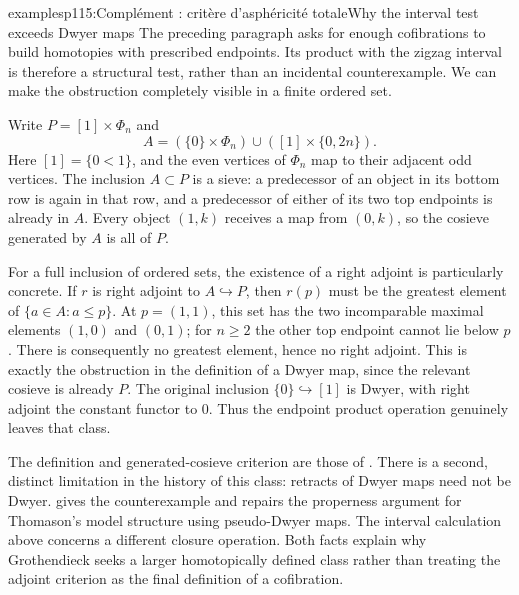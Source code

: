 \begin{dcomment}{examples}{p115:Complément : critère d'asphéricité totale}{Why the interval test exceeds Dwyer maps}
The preceding paragraph asks for enough cofibrations to build homotopies with prescribed endpoints.  Its product with the zigzag interval is therefore a structural test, rather than an incidental counterexample.  We can make the obstruction completely visible in a finite ordered set.

Write $P=[1]\times\Phi_n$ and
\[
 A=(\{0\}\times\Phi_n)\cup([1]\times\{0,2n\}).
\]
Here $[1]=\{0<1\}$, and the even vertices of $\Phi_n$ map to their adjacent odd vertices.  The inclusion $A\subset P$ is a sieve: a predecessor of an object in its bottom row is again in that row, and a predecessor of either of its two top endpoints is already in $A$.  Every object $(1,k)$ receives a map from $(0,k)$, so the cosieve generated by $A$ is all of $P$.

For a full inclusion of ordered sets, the existence of a right adjoint is particularly concrete.  If $r$ is right adjoint to $A\hookrightarrow P$, then $r(p)$ must be the greatest element of $\{a\in A:a\leq p\}$.  At $p=(1,1)$, this set has the two incomparable maximal elements $(1,0)$ and $(0,1)$; for $n\geq2$ the other top endpoint cannot lie below $p$.  There is consequently no greatest element, hence no right adjoint.  This is exactly the obstruction in the definition of a Dwyer map, since the relevant cosieve is already $P$.  The original inclusion $\{0\}\hookrightarrow[1]$ is Dwyer, with right adjoint the constant functor to $0$.  Thus the endpoint product operation genuinely leaves that class.

The definition and generated-cosieve criterion are those of \citet[Definition~4.1 and Lemma~5.2]{Thomason1980}.  There is a second, distinct limitation in the history of this class: retracts of Dwyer maps need not be Dwyer.  \citet[pp.~228--231, especially Proposition~2]{Cisinski1999Dwyer} gives the counterexample and repairs the properness argument for Thomason's model structure using pseudo-Dwyer maps.  The interval calculation above concerns a different closure operation.  Both facts explain why Grothendieck seeks a larger homotopically defined class rather than treating the adjoint criterion as the final definition of a cofibration.
\end{dcomment}

